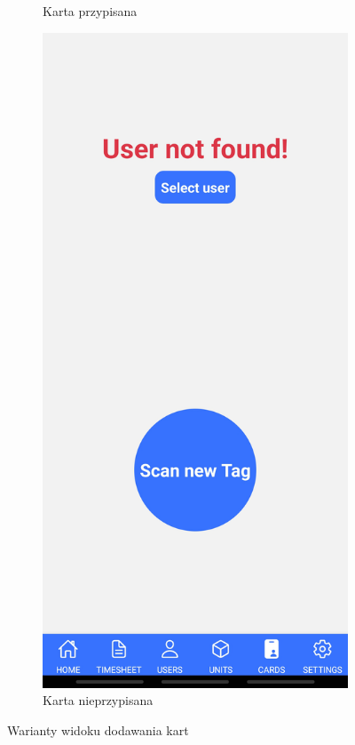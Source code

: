 \begin{figure}[H]
\begin{subfigure}[b]{0.3\textwidth}
        \caption{Karta przypisana}
    \end{subfigure}
    \begin{subfigure}[b]{0.3\textwidth}
        \centering
        \includegraphics[width=\textwidth, frame]{graf/mobile/cardNotOwned.jpg}
        \caption{Karta nieprzypisana}
    \end{subfigure}
    \caption{Warianty widoku dodawania kart}
    \label{fig:cardView}
\end{figure}

